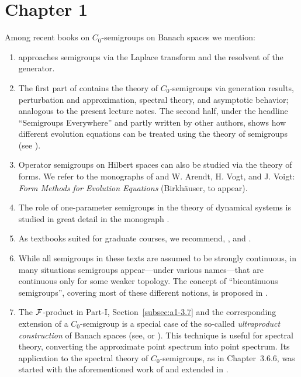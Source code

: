 \setcounter{section}{0}
\notesheaderone
\thispagestyle{empty}
\section*{Chapter 1}
Among recent books on $C_{0}$-semigroups on Banach spaces we mention:
\begin{enumerate}
\item 
\textcite{zbmath05842872} approaches semigroups via the Laplace transform and the resolvent of the generator. 

\item 
The first part of \textcite{zbmath01354832} contains the theory of $C_{0}$-semigroups via generation results, perturbation and approximation, spectral theory, and asymptotic behavior; analogous to the present lecture notes. 
The second half, under the headline \enquote{Semigroups Everywhere} and partly written by other authors, shows how different evolution equations can be treated using the theory of semigroups (see \textcite[Chap. VI]{zbmath01354832}).

\item 
Operator semigroups on Hilbert spaces can also be studied via the theory of forms.
We refer to the monographs of \textcite{zbmath02168554} and W. Arendt, H. Vogt, and J. Voigt: \emph{Form Methods for Evolution Equations} (Birkhäuser, to appear).

\item
The role of one-parameter semigroups in the theory of dynamical systems is studied in great detail in the monograph \textcite{zbmath01329917}.

\item
As textbooks suited for graduate courses, we recommend, \eg 
\textcite{zbmath07066876}, \textcite{zbmath05051510} and
\textcite{zbmath06706234}.

\item
While all semigroups in these texts are assumed to be strongly continuous, in many situations semigroups appear---under various names---that are continuous only for some weaker topology. 
The concept of \enquote{bicontinuous semigroups}, covering most of these different notions, is proposed in \textcite{zbmath02051541}. 
\item
The $\mathcal{F}$-product in Part-I, Section~\ref{subsec:a1-3.7} and the corresponding extension of a $C_{0}$-semigroup is a special case of the so-called \emph{ultraproduct construction} of Banach spaces (see, \eg \textcite{zbmath03640303} or \textcite{zbmath03987965}).
This technique is useful for spectral theory, converting the approximate point spectrum into point spectrum. 
Its application to the spectral theory of $C_{0}$-semigroups, as in 
\mbox{Chapter 3.6.6}, was started with the aforementioned work of \textcite{derndingerEN:1980} and extended in \textcite{zbmath069217}.


\end{enumerate}
